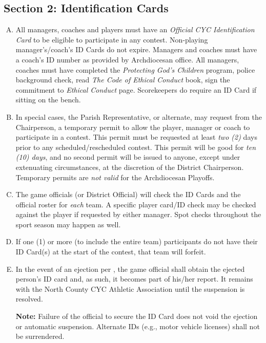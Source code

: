 \subsection{Section 2: Identification Cards}
\label{ssec:bylaw-3-2}
\begin{enumerate}[A.]
    \item All managers, coaches and players must have an {\em Official CYC Identification Card} to be eligible to participate in any contest.  Non-playing manager’s/coach’s ID Cards do not expire.  Managers and coaches must have a coach's ID number as provided by Archdiocesan office.  All managers, coaches must have completed the {\em Protecting God’s Children} program, police background check, read {\em The Code of Ethical Conduct} book, sign the commitment to {\em Ethical Conduct} page.  Scorekeepers do require an ID Card if sitting on the bench.
    \item In special cases, the Parish Representative, or alternate, may request from the Chairperson, a temporary permit to allow the player, manager or coach to participate in a contest.  This permit must be requested at least {\em two (2)} days prior to any scheduled/rescheduled contest.  This permit will be good for {\em ten (10) days}, and no second permit will be issued to anyone, except under extenuating circumstances, at the discre­tion of the District Chairperson.  Temporary permits are {\em not valid} for the Archdiocesan Playoffs.
    \item The game officials (or District Official) will check the ID Cards and the official roster for {\em each} team. A specific player card/ID check may be checked against the player if requested by either manager. Spot checks throughout the sport season may happen as well.
    \item If one (1) or more (to include the entire team) participants do not have their ID Card(s) at the start of the contest, that team will forfeit.
    \item In the event of an ejection per , the game official shall obtain the ejected person’s ID card and, as such, it becomes part of his/her report. It remains with the North County CYC Athletic Association until the suspension is resolved.
        
    \textbf{Note:}  Failure of the official to secure the ID Card does not void the ejection or automatic suspension.  Alternate IDs (e.g., motor vehicle licenses) shall not be surrendered.
\end{enumerate}

